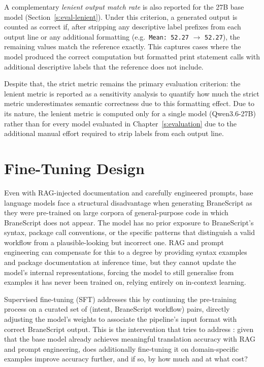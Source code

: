 A complementary \emph{lenient output match rate} is also reported for the
27B base model (Section~\ref{s:eval-lenient}). Under this criterion, a
generated output is counted as correct if, after stripping any descriptive
label prefixes from each output line or any additional formatting (e.g.\ \texttt{Mean: 52.27} $\to$
\texttt{52.27}), the remaining values match the reference exactly. This
captures cases where the model produced the correct computation but formatted
print statement calls with additional descriptive labels that the reference does not
include.

Despite that, the strict metric remains the primary evaluation criterion: the lenient metric
is reported as a sensitivity analysis to quantify how much the strict metric
underestimates semantic correctness due to this formatting effect. Due to its nature,
the lenient metric is computed only for a single model (Qwen3.6-27B) rather than for
every model evaluated in Chapter~\ref{s:evaluation} due to the additional manual 
effort required to strip labels from each output line.

\section{Fine-Tuning Design}\label{s:fine-tuning-design}

Even with RAG-injected documentation and carefully engineered prompts, base
language models face a structural disadvantage when generating BraneScript as they
were pre-trained on large corpora of general-purpose code in which BraneScript
does not appear. The model has no prior exposure to BraneScript's syntax,
package call conventions, or the specific patterns that distinguish a valid
workflow from a plausible-looking but incorrect one. RAG and prompt engineering
can compensate for this to a degree by providing syntax examples and package
documentation at inference time, but they cannot update the model's internal
representations, forcing the model to still generalise from examples it has
never been trained on, relying entirely on in-context learning.

Supervised fine-tuning (SFT) addresses this by continuing the pre-training
process on a curated set of (intent, BraneScript workflow) pairs, directly
adjusting the model's weights to associate the pipeline's input format with
correct BraneScript output. This is the intervention that tries to address : given
that the base model already achieves meaningful translation accuracy with RAG
and prompt engineering, does additionally fine-tuning it on domain-specific
examples improve accuracy further, and if so, by how much and at what cost?

